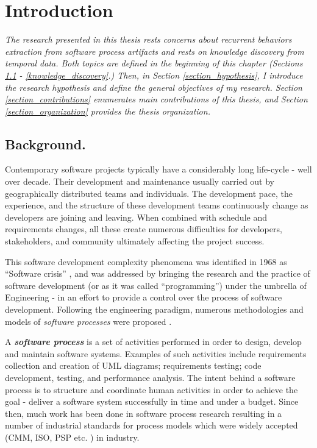 \chapter{Introduction}

\textit{The research presented in this thesis rests concerns about recurrent behaviors extraction from
software process artifacts and rests on knowledge discovery from temporal data. Both topics are defined
in the beginning of this chapter (Sections \ref{section_background} - \ref{knowledge_discovery}.)
Then, in Section \ref{section_hypothesis}, I introduce the research hypothesis and define the general 
objectives of my research. Section \ref{section_contributions} enumerates main contributions of this thesis,
and Section \ref{section_organization} provides the thesis organization.
}

\section{Background.}\label{section_background}
Contemporary software projects typically have a considerably long life-cycle - well over decade.
Their development and maintenance usually carried out by geographically distributed teams 
and individuals. The development pace, the experience, and the structure of these development 
teams continuously change as developers are joining and leaving. When combined with
schedule and requirements changes, all these create numerous difficulties 
for developers, stakeholders, and community ultimately affecting the project success. 

This software development complexity phenomena was identified in 1968 as ``Software crisis'' \cite{crisis}, 
and was addressed by bringing the research and the practice of software development 
(or as it was called ``programming'') under the umbrella of Engineering - in an effort to provide a 
control over the process of software development. 
Following the engineering paradigm, numerous methodologies and models of \textit{software processes}
were proposed \cite{citeulike:10002165}.

A \textbf{\textit{software process}} is a set of activities performed in order to design, develop and maintain 
software systems. Examples of such activities include requirements collection and creation of UML diagrams;
requirements testing; code development, testing, and performance analysis. 
The intent behind a software process is to structure and coordinate human activities in order to achieve 
the goal - deliver a software system successfully in time and under a budget.
Since then, much work has been done in software process research resulting in a number of industrial standards for 
process models which were widely accepted (CMM, ISO, PSP etc. \cite{citeulike:5043104}) in industry. 

